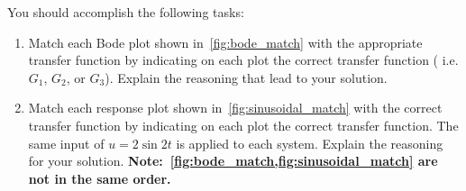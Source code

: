 \documentclass[titlepage, 11pt, reqno]{article}    %
\begin{document}
You should accomplish the following tasks:
\begin{enumerate}
    \item Match each Bode plot shown in~\cref{fig:bode_match}  with the appropriate transfer function by indicating on each plot the correct transfer function ( i.e. \(G_1\), \(G_2\), or \(G_3\)).
        Explain the reasoning that lead to your solution.
    \item Match each response plot shown in~\cref{fig:sinusoidal_match} with the correct transfer function by indicating on each plot the correct transfer function. 
        The same input of \(u = 2 \sin 2t \) is applied to each system.
        Explain the reasoning for your solution.
        \textbf{Note:~\cref{fig:bode_match,fig:sinusoidal_match} are not in the same order.}
\end{enumerate}
\clearpage
\end{document}
